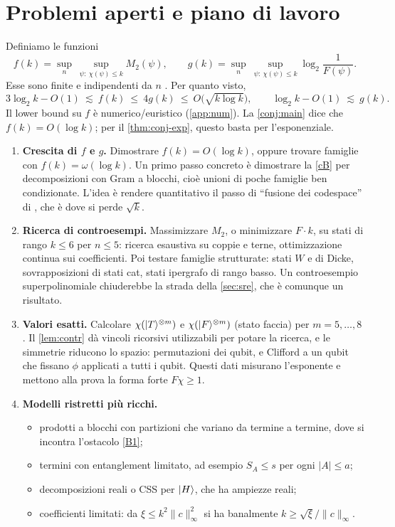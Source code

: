 \section{Problemi aperti e piano di lavoro}\label{sec:open}

Definiamo le funzioni
\[
f(k)=\sup_{n}\ \sup_{\psi:\ \chi(\psi)\le k}M_2(\psi),\qquad
g(k)=\sup_{n}\ \sup_{\psi:\ \chi(\psi)\le k}\log_2\frac1{F(\psi)} .
\]
Esse sono finite e indipendenti da $n$ \cite{SL26}. Per quanto visto,
\[
3\log_2k-O(1)\ \lesssim\ f(k)\ \le\ 4g(k)\ \le\ O\bigl(\sqrt{k\log k}\bigr),
\qquad \log_2k-O(1)\ \lesssim\ g(k).
\]
Il lower bound su $f$ è numerico/euristico (\cref{app:num}). La \cref{conj:main} dice che $f(k)=O(\log k)$; per il \cref{thm:conj-exp}, questo basta per l'esponenziale.

\begin{enumerate}[label=\textbf{P\arabic*.},leftmargin=2.2em]
\item \textbf{Crescita di $f$ e $g$.} Dimostrare $f(k)=O(\log k)$, oppure trovare famiglie con $f(k)=\omega(\log k)$. Un primo passo concreto è dimostrare la \ref{cB} per decomposizioni con Gram a blocchi, cioè unioni di poche famiglie ben condizionate. L'idea è rendere quantitativo il passo di ``fusione dei codespace'' di \cite{SL26}, che è dove si perde $\sqrt k$.

\item \textbf{Ricerca di controesempi.} Massimizzare $M_2$, o minimizzare $F\cdot k$, su stati di rango $k\le 6$ per $n\le 5$: ricerca esaustiva su coppie e terne, ottimizzazione continua sui coefficienti. Poi testare famiglie strutturate: stati $W$ e di Dicke, sovrapposizioni di stati cat, stati ipergrafo di rango basso. Un controesempio superpolinomiale chiuderebbe la strada della \cref{sec:sre}, che è comunque un risultato.

\item \textbf{Valori esatti.} Calcolare $\chi(\lvert T\rangle^{\otimes m})$ e $\chi(\lvert F\rangle^{\otimes m})$ (stato faccia) per $m=5,\dots,8$. Il \cref{lem:contr} dà vincoli ricorsivi utilizzabili per potare la ricerca, e le simmetrie riducono lo spazio: permutazioni dei qubit, e Clifford a un qubit che fissano $\phi$ applicati a tutti i qubit. Questi dati misurano l'esponente e mettono alla prova la forma forte $F\chi\ge1$.

\item \textbf{Modelli ristretti più ricchi.}
\begin{itemize}
\item prodotti a blocchi con partizioni che variano da termine a termine, dove si incontra l'ostacolo \ref{B1};
\item termini con entanglement limitato, ad esempio $S_A\le s$ per ogni $|A|\le a$;
\item decomposizioni reali o CSS per $\lvert H\rangle$, che ha ampiezze reali;
\item coefficienti limitati: da $\xi\le k^2\|c\|_\infty^2$ si ha banalmente $k\ge\sqrt{\xi}/\|c\|_\infty$.
\end{itemize}


\end{enumerate}
